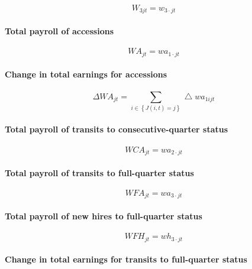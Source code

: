 \begin{equation}
W_{3jt} = w_{3\cdot jt}
\end{equation}

\paragraph{Total payroll of accessions}

\begin{equation}
WA_{jt} = wa_{1\cdot jt}
\end{equation}

\paragraph{Change in total earnings for accessions}

\begin{equation}
\Delta WA_{jt}=\sum\limits_{i\in \left\{ {J(i,t)=j}\right\} }\bigtriangleup
wa_{1ijt}
\end{equation}

\paragraph{Total payroll of transits to consecutive-quarter status}

\begin{equation}
WCA_{jt}=wa_{2\cdot jt}
\end{equation}

\paragraph{Total payroll of transits to full-quarter status}

\begin{equation}
WFA_{jt}=wa_{3\cdot jt}
\end{equation}

\paragraph{Total payroll of new hires to full-quarter status}

\begin{equation}
WFH_{jt}=wh_{3\cdot jt}
\end{equation}

\paragraph{Change in total earnings for transits to full-quarter status}

